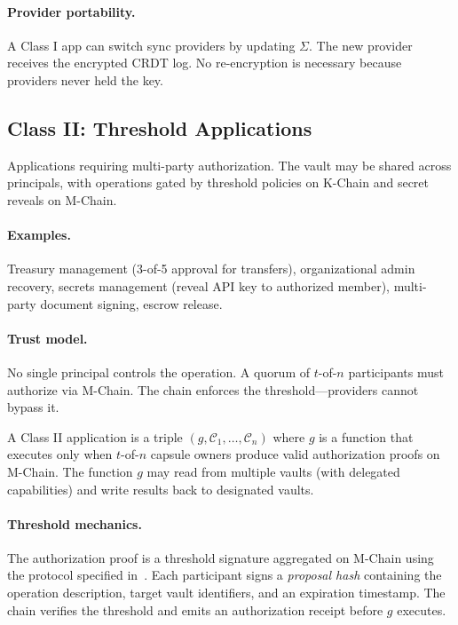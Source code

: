 \paragraph{Provider portability.} A Class I app can switch sync providers by
updating $\Sigma$. The new provider receives the encrypted CRDT log. No
re-encryption is necessary because providers never held the key.

\subsection{Class II: Threshold Applications}\label{sec:class2}

Applications requiring multi-party authorization. The vault may be shared across
principals, with operations gated by threshold policies on K-Chain and secret
reveals on M-Chain.

\paragraph{Examples.} Treasury management (3-of-5 approval for transfers),
organizational admin recovery, secrets management (reveal API key to authorized
member), multi-party document signing, escrow release.

\paragraph{Trust model.} No single principal controls the operation. A quorum
of $t$-of-$n$ participants must authorize via M-Chain. The chain enforces the
threshold---providers cannot bypass it.

\begin{definition}\label{def:class2}
A Class II application is a triple $(g, \mathcal{C}_1, \ldots, \mathcal{C}_n)$
where $g$ is a function that executes only when $t$-of-$n$ capsule owners
produce valid authorization proofs on M-Chain. The function $g$ may read from
multiple vaults (with delegated capabilities) and write results back to
designated vaults.
\end{definition}

\paragraph{Threshold mechanics.} The authorization proof is a threshold signature
aggregated on M-Chain using the protocol specified in~\cite{lux-mchain-mpc}.
Each participant signs a \textit{proposal hash} containing the operation
description, target vault identifiers, and an expiration timestamp. The chain
verifies the threshold and emits an authorization receipt before $g$ executes.

